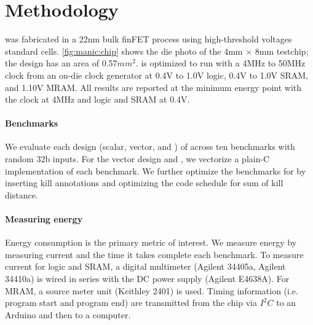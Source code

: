 \section{Methodology}
\label{manic:method}
\figMANICChip
\msilicon was fabricated in a 22nm bulk finFET process using high-threshold voltages standard cells.
%
\autoref{fig:manic:chip} shows the die photo of the 4mm $\times$ 8mm testchip; the \manic design has an area of 0.57$mm^2$.
%
\msilicon is optimized to run with a 4MHz to 50MHz clock from an on-die clock generator at 0.4V to 1.0V logic, 0.4V to 1.0V SRAM, and 1.10V MRAM.
% 
All results are reported at the minimum energy point with the clock at 4MHz and logic and SRAM at 0.4V.

\paragraph{Benchmarks}
We evaluate each design (scalar, vector, and \manic) of \msilicon across ten benchmarks with random 32b inputs.
% 
For the vector design and \manic, we vectorize a plain-C implementation of each benchmark.
% 
We further optimize the benchmarks for \manic by inserting kill annotations and optimizing the code schedule for sum of kill distance.

\paragraph{Measuring energy}
Energy consumption is the primary metric of interest.
% 
We measure energy by measuring current and the time it takes complete each benchmark.
% 
To measure current for logic and SRAM, a digital multimeter (Agilent 34405a, Agilent 34410a) is wired in series with the DC power supply (Agilent E4638A). 
% 
For MRAM, a source meter unit (Keithley 2401) is used. 
% 
Timing information (i.e. program start and program end) are transmitted from the chip via $I^2 C$ to an Arduino and then to a computer.